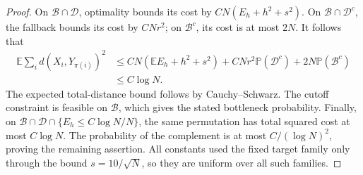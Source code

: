 \documentclass[11pt]{article}
\newcommand{\Pbb}{\mathbb P}
\newcommand{\Ebb}{\mathbb E}
\theoremstyle{remark}
\numberwithin{equation}{section}
\begin{document}
\begin{proof}
On \(\mathcal B\cap\mathcal D\), optimality bounds its cost by
\(CN(E_h+h^2+s^2)\). On
\(\mathcal B\cap\mathcal D^c\), the fallback bounds its cost by
\(CNr^2\); on \(\mathcal B^c\), its cost is at most \(2N\).
It follows that
\begin{align*}
 \Ebb\sum_i d(X_i,Y_{\pi(i)})^2
 &\le CN(\Ebb E_h+h^2+s^2)
       +CNr^2\Pbb(\mathcal D^c)+2N\Pbb(\mathcal B^c)\\
 &\le C\log N.
\end{align*}
The expected total-distance bound follows by Cauchy--Schwarz.
The cutoff constraint is feasible on \(\mathcal B\), which gives
the stated bottleneck probability. Finally, on
\(\mathcal B\cap\mathcal D\cap\{E_h\le C\log N/N\}\), the
same permutation has total squared cost at most \(C\log N\).
The probability of the complement is at most \(C/(\log N)^2\),
proving the remaining assertion. All constants used the fixed target
family only through the bound \(s=10/\sqrt N\), so they are
uniform over all such families.
\end{proof}
\end{document}
